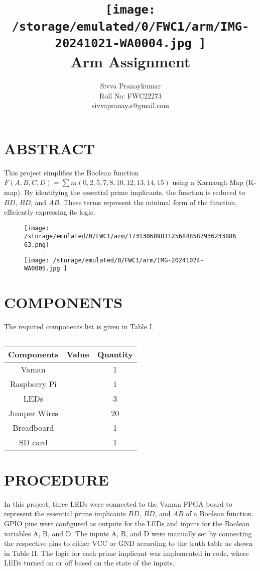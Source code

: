 \documentclass[conference]{IEEEtran}
\title{
\vspace{1cm}
{\texttt{[image: /storage/emulated/0/FWC1/arm/IMG-20241021-WA0004.jpg       ]} \\ Arm Assignment} }
\author{Sivva Pranaykumar \\ Roll No: FWC22273 \\ sivvapranay.s@gmail.com}
\begin{document}
\maketitle

\section{ABSTRACT}
This project simplifies the Boolean function $F(A,B,C,D)=\sum m(0,2,5,7,8,10,12,13,14,15)$ using a Karnaugh Map (K-map). By identifying the essential prime implicants, the function is reduced to $BD$, $\overline{BD}$, and $AB$. These terms represent the minimal form of the function, efficiently expressing its logic.

\begin{figure}[h]
\centering
\texttt{[image: /storage/emulated/0/FWC1/arm/17313068981125684858793623388663.png]}
\caption{\label{fig:Gates}}
\end{figure}
\begin {figure} [h]
 \centering
 \texttt{[image:   /storage/emulated/0/FWC1/arm/IMG-20241024-WA0005.jpg   ]}
 \caption{\label{fig:Gates}}
 \end {figure}




\section{COMPONENTS}
The required components list is given in Table I.

\begin{table}[htbp]
\centering
\begin{tabular}{|c|c|c|} \hline
Components & Value & Quantity \\ \hline
Vaman & & 1 \\ \hline
Raspberry Pi & & 1 \\ \hline
LEDs & & 3 \\ \hline
Jumper Wires & & 20 \\ \hline
Breadboard & & 1 \\ \hline
SD card & & 1\\
\hline
\end{tabular}
\vspace{0.1cm}
\caption{\label{tab:widgets}}
\end{table}

\section{PROCEDURE}
In this project, three LEDs were connected to the Vaman FPGA board to represent the essential prime implicants $BD$, $\overline{BD}$, and $AB$ of a Boolean function. GPIO pins were configured as outputs for the LEDs and inputs for the Boolean variables A, B, and D. The inputs A, B, and D were manually set by connecting the respective pins to either VCC or GND according to the truth table as shown in Table II. The logic for each prime implicant was implemented in code, where LEDs turned on or off based on the state of the inputs.
\end{document}
